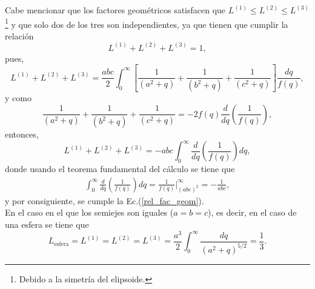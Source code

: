 \noindent Cabe mencionar que los factores geométricos  satisfacen que $L^{(1)}\leq L^{(2)}\leq L^{(3)}$\footnote{Debido a la simetría del elipsoide.} y que solo dos de los tres son independientes, ya que tienen que cumplir la relación 
\begin{equation}
    L^{(1)}+L^{(2)}+L^{(3)}=1,
    \label{rel_fac_geom}
\end{equation}
pues, 
\begin{equation*}
	L^{(1)}+L^{(2)}+L^{(3)}=\frac{abc}{2}\int_0^{\infty}\left[\frac{1}{(a^2+q)}+\frac{1}{(b^2+q)}+\frac{1}{(c^2+q)}\right]\frac{dq}{f(q)},
\end{equation*}
y como
$$\frac{1}{(a^2+q)}+\frac{1}{(b^2+q)}+\frac{1}{(c^2+q)}=-2 f(q)\frac{d}{dq}\left(\frac{1}{f(q)}\right),$$
entonces,
$$L^{(1)}+L^{(2)}+L^{(3)}=-abc\int_0^{\infty}\frac{d}{dq}\left(\frac{1}{f(q)}\right)dq,$$
donde usando el teorema fundamental del cálculo se tiene que
\begin{align*}
	\int_0^{\infty}\frac{d}{dq}\left(\frac{1}{f(q)}\right)dq=\frac{1}{f(q)}\Big|_{(abc)^2}^{\infty}=-\frac{1}{abc},
\end{align*}
y por consiguiente, se cumple la Ec.(\ref{rel_fac_geom}).\\

\noindent En el caso en el que los semiejes son iguales ($a=b=c$), es decir, en el caso de una esfera se tiene que
\begin{equation*}
    L_{\text{esfera}}=L^{(1)}=L^{(2)}=L^{(3)}=\frac{a^3}{2}\int_0^{\infty}\frac{dq}{(a^2+q)^{5/2}}=\frac{1}{3}.
\end{equation*}

